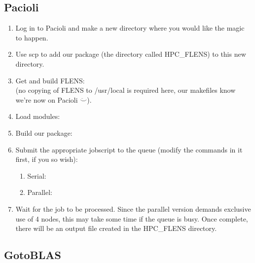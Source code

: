 \subsection{Pacioli}

\begin{enumerate}
   \item Log in to Pacioli and make a new directory where you would like the magic to happen.
   \item Use scp to add our package (the directory called HPC\_FLENS) to this new directory.
   \item Get and build FLENS: 
   \\
   (no copying of FLENS to /usr/local is required here, our makefiles know we're now on Pacioli $\ddot\smile$).
   
   \item Load modules:
   
   \item Build our package:
   
   \item Submit the appropriate jobscript to the queue (modify the commands in it first, if you so wish):
   
   \begin{enumerate}
   \item Serial:
   
   \item Parallel:
   
   \end{enumerate}
   
   \item Wait for the job to be processed. Since the parallel version demands exclusive use of 4 nodes, this may take some time if the queue is busy. Once complete, there will be an output file created in the HPC\_FLENS directory.
      
      
 \end{enumerate}
 
 \subsection{GotoBLAS}
 
